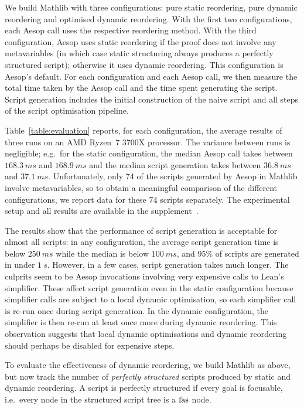We build Mathlib with three configurations: pure static reordering, pure dynamic reordering and optimised dynamic reordering.
With the first two configurations, each Aesop call uses the respective reordering method.
With the third configuration, Aesop uses static reordering if the proof does not involve any metavariables (in which case static structuring always produces a perfectly structured script); otherwise it uses dynamic reordering.
This configuration is Aesop's default.
For each configuration and each Aesop call, we then measure the total time taken by the Aesop call and the time spent generating the script.
Script generation includes the initial construction of the naive script and all steps of the script optimisation pipeline.

Table~\ref{table:evaluation} reports, for each configuration, the average results of three runs on an AMD Ryzen~7 3700X processor.
The variance between runs is negligible; e.g.\ for the static configuration, the median Aesop call takes between $\SI{168.3}{ms}$ and $\SI{168.9}{ms}$ and the median script generation takes between $\SI{36.8}{ms}$ and $\SI{37.1}{ms}$.
Unfortunately, only 74 of the scripts generated by Aesop in Mathlib involve metavariables, so to obtain a meaningful comparison of the different configurations, we report data for these 74 scripts separately.
The experimental setup and all results are available in the supplement~\cite{ScriptSupplement}.

The results show that the performance of script generation is acceptable for almost all scripts: in any configuration, the average script generation time is below $\SI{250}{ms}$ while the median is below $\SI{100}{ms}$, and 95\% of scripts are generated in under $\SI{1}{s}$.
However, in a few cases, script generation takes much longer.
The culprits seem to be Aesop invocations involving very expensive calls to Lean's simplifier.
These affect script generation even in the static configuration because simplifier calls are subject to a local dynamic optimisation, so each simplifier call is re-run once during script generation.
In the dynamic configuration, the simplifier is then re-run at least once more during dynamic reordering.
This observation suggests that local dynamic optimisations and dynamic reordering should perhaps be disabled for expensive steps.

To evaluate the effectiveness of dynamic reordering, we build Mathlib as above, but now track the number of \emph{perfectly structured} scripts produced by static and dynamic reordering.
A script is perfectly structured if every goal is focusable, i.e.\ every node in the structured script tree is a ${\operatorname{fas}}$ node.

